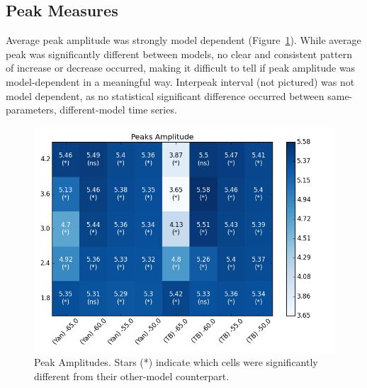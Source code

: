 \documentclass[11pt]{article}
\begin{document}
\subsection{Peak Measures}
Average peak amplitude was strongly model dependent (Figure~\ref{fig:hmPA}). While average peak was significantly different between models, no clear and consistent pattern of increase or decrease occurred, making it difficult to tell if peak amplitude was model-dependent in a meaningful way. Interpeak interval (not pictured) was not model dependent, as no statistical significant difference occurred between same-parameters, different-model time series.
\begin{figure}[h]
	\centering
	\includegraphics[scale=.4]{heatmap_Peaks_Amplitude.png}
	\caption{Peak Amplitudes. Stars (*) indicate  which cells were significantly different from their other-model counterpart.}
	\label{fig:hmPA}

\end{figure}
 

 
\end{document}

